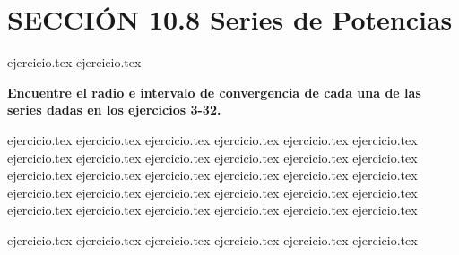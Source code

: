 
\section*{SECCIÓN 10.8 \quad Series de Potencias}

\begin{enumerate}
    {ejercicio.tex}
{ejercicio.tex}
\end{enumerate}

\vspace{0.3cm}
\noindent\textbf{Encuentre el radio e intervalo de convergencia de cada una de las series dadas en los ejercicios 3-32.}

\begin{enumerate}
    \setcounter{enumi}{2}
    {ejercicio.tex}
{ejercicio.tex}
{ejercicio.tex}
{ejercicio.tex}
{ejercicio.tex}
{ejercicio.tex}
{ejercicio.tex}
{ejercicio.tex}
{ejercicio.tex}
{ejercicio.tex}
{ejercicio.tex}
{ejercicio.tex}
{ejercicio.tex}
{ejercicio.tex}
{ejercicio.tex}
{ejercicio.tex}
{ejercicio.tex}
{ejercicio.tex}
{ejercicio.tex}
{ejercicio.tex}
{ejercicio.tex}
{ejercicio.tex}
{ejercicio.tex}
{ejercicio.tex}
{ejercicio.tex}
{ejercicio.tex}
{ejercicio.tex}
{ejercicio.tex}
{ejercicio.tex}
{ejercicio.tex}
\end{enumerate}

\vspace{0.3cm}
\begin{enumerate}
    \setcounter{enumi}{32}
    {ejercicio.tex}
{ejercicio.tex}
{ejercicio.tex}
{ejercicio.tex}
{ejercicio.tex}
{ejercicio.tex}
\end{enumerate}
